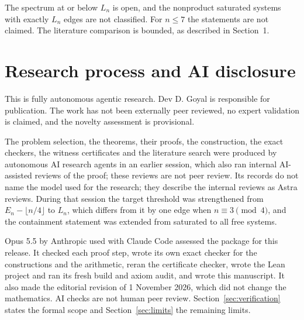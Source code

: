 \documentclass[11pt]{article}
\theoremstyle{remark}
\begin{document}
The spectrum at or below $L_n$ is open, and the nonproduct saturated
systems with exactly $L_n$ edges are not classified. For $n\le7$ the
statements are not claimed. The literature comparison is bounded, as
described in Section~1.

\section{Research process and AI disclosure}\label{sec:disclosure}

This is fully autonomous agentic research. Dev D. Goyal is responsible for
publication. The work has not been externally peer reviewed, no expert
validation is claimed, and the novelty assessment is provisional.

The problem selection, the theorems, their proofs, the construction, the
exact checkers, the witness certificates and the literature search were
produced by autonomous AI research agents in an earlier session, which also
ran internal AI-assisted reviews of the proof; these reviews are not peer
review. Its records do not name the model used for the research; they
describe the internal reviews as Astra reviews. During that session the
target threshold was strengthened from $E_n-\lfloor n/4\rfloor$ to $L_n$,
which differs from it by one edge when $n\equiv3\pmod 4$, and the
containment statement was extended from saturated to all free systems.

Opus 5.5 by Anthropic used with Claude Code assessed the package for this
release. It checked each proof step, wrote its own exact checker for the
constructions and the arithmetic, reran the certificate checker, wrote the
Lean project and ran its fresh build and axiom audit, and wrote this
manuscript. It also made the editorial revision of 1 November 2026, which
did not change the mathematics. AI checks are not human peer review.
Section~\ref{sec:verification} states the formal scope and
Section~\ref{sec:limits} the remaining limits.
\end{document}
